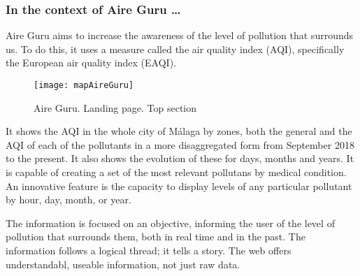 \subsubsection*{In the context of Aire Guru \ldots} 

Aire Guru aims to increase the awareness of the level of pollution that surrounds us. To do this, it uses a measure called
the air quality index (AQI), specifically the European air quality index (EAQI).

\begin{figure}[ht]
    \centering
    \texttt{[image: mapAireGuru]}
    \caption{Aire Guru. Landing page. Top section}
\end{figure}

It shows the AQI in the whole city of Málaga by zones, both the general and the AQI of each of the 
pollutants in a more disaggregated form from September 2018 to the present. It also shows the evolution
of these for days, months and years.
It is capable of creating a set of the most relevant pollutans by medical condition. An innovative feature is the capacity to display levels of any particular pollutant by hour, day, month, or year. 


\begin{itemize}
    \done The information is focused on an objective, informing the user of the level of pollution that surrounds them, both  in real time
    and in the past.
    \done The information follows a logical thread; it tells a story.
    \done The web offers understandabl, useable information, not just raw data.
\end{itemize}